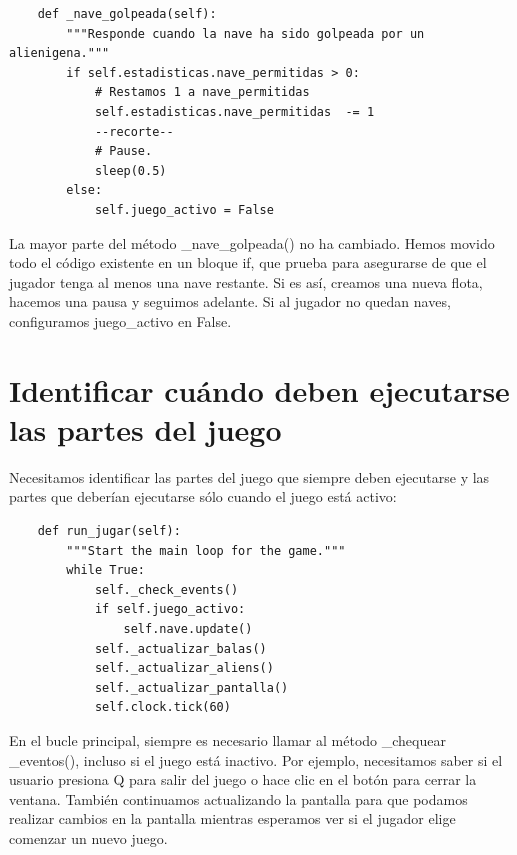 \vspace{-0.2cm}
\hspace{-2.1cm}{\ttfamily \scriptsize \_alien.py}\vspace{-0.84cm}
\begin{lstlisting}
    def _nave_golpeada(self):
        """Responde cuando la nave ha sido golpeada por un alienigena."""
        if self.estadisticas.nave_permitidas > 0:
            # Restamos 1 a nave_permitidas
            self.estadisticas.nave_permitidas  -= 1
            --recorte--
            # Pause.
            sleep(0.5)
        else:
            self.juego_activo = False
\end{lstlisting}

La mayor parte del método  {\ttfamily \_nave\_golpeada()} no ha cambiado. Hemos movido todo el código existente
en un bloque {\ttfamily if}, que prueba para asegurarse de que el jugador tenga al menos una nave
restante. Si es así, creamos una nueva flota, hacemos una pausa y seguimos adelante. Si al jugador no quedan naves, configuramos  {\ttfamily juego\_activo} en  {\ttfamily False}.

\section{Identificar cuándo deben ejecutarse las partes del juego}

Necesitamos identificar las partes del juego que siempre deben ejecutarse y las
partes que deberían ejecutarse sólo cuando el juego está activo:


\hspace{-2.4cm}{\ttfamily \scriptsize invasión}

\vspace{-0.2cm}
\hspace{-2.1cm}{\ttfamily \scriptsize \_alien.py}\vspace{-0.84cm}
\begin{lstlisting}
    def run_jugar(self):
        """Start the main loop for the game."""
        while True:
            self._check_events()
            if self.juego_activo:
                self.nave.update()
            self._actualizar_balas()
            self._actualizar_aliens()
            self._actualizar_pantalla()
            self.clock.tick(60)
\end{lstlisting}


En el bucle principal, siempre es necesario llamar al método  {\ttfamily \_chequear\\ \_eventos()}, incluso si
el juego está inactivo. Por ejemplo, necesitamos saber si el usuario presiona  {\ttfamily Q} para
salir del juego o hace clic en el botón para cerrar la ventana. También continuamos
actualizando la pantalla para que podamos realizar cambios en la pantalla mientras esperamos
ver si el jugador elige comenzar un nuevo juego.

